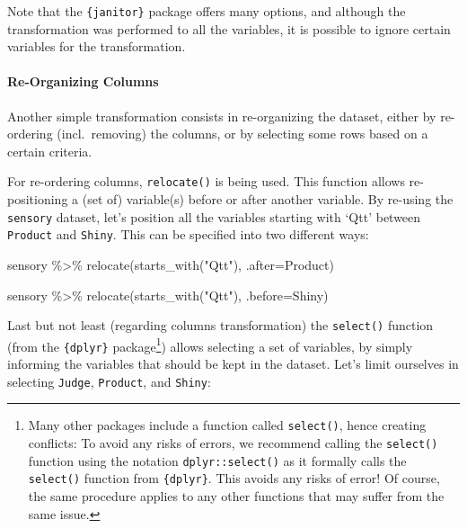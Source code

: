 \documentclass[
]{book}
\newenvironment{Shaded}{\begin{snugshade}}{\end{snugshade}}
\newcommand{\AttributeTok}[1]{\textcolor[rgb]{0.77,0.63,0.00}{#1}}
\newcommand{\FunctionTok}[1]{\textcolor[rgb]{0.00,0.00,0.00}{#1}}
\newcommand{\NormalTok}[1]{#1}
\newcommand{\SpecialCharTok}[1]{\textcolor[rgb]{0.00,0.00,0.00}{#1}}
\newcommand{\StringTok}[1]{\textcolor[rgb]{0.31,0.60,0.02}{#1}}
\begin{document}
Note that the \texttt{\{janitor\}} package offers many options, and although the transformation was performed to all the variables, it is possible to ignore certain variables for the transformation.

\hypertarget{re-organizing-columns}{%
\paragraph{Re-Organizing Columns}\label{re-organizing-columns}}

Another simple transformation consists in re-organizing the dataset, either by re-ordering (incl.~removing) the columns, or by selecting some rows based on a certain criteria.

For re-ordering columns, \texttt{relocate()} is being used. This function allows re-positioning a (set of) variable(s) before or after another variable. By re-using the \texttt{sensory} dataset, let's position all the variables starting with `Qtt' between \texttt{Product} and \texttt{Shiny}. This can be specified into two different ways:

\begin{Shaded}
\begin{Highlighting}[]
\NormalTok{sensory }\SpecialCharTok{\%\textgreater{}\%} 
  \FunctionTok{relocate}\NormalTok{(}\FunctionTok{starts\_with}\NormalTok{(}\StringTok{"Qtt"}\NormalTok{), }\AttributeTok{.after=}\NormalTok{Product)}

\NormalTok{sensory }\SpecialCharTok{\%\textgreater{}\%} 
  \FunctionTok{relocate}\NormalTok{(}\FunctionTok{starts\_with}\NormalTok{(}\StringTok{"Qtt"}\NormalTok{), }\AttributeTok{.before=}\NormalTok{Shiny)}
\end{Highlighting}
\end{Shaded}

Last but not least (regarding columns transformation) the \texttt{select()} function (from the \texttt{\{dplyr\}} package\footnote{Many other packages include a function called \texttt{select()}, hence creating conflicts: To avoid any risks of errors, we recommend calling the \texttt{select()} function using the notation \texttt{dplyr::select()} as it formally calls the \texttt{select()} function from \texttt{\{dplyr\}}. This avoids any risks of error! Of course, the same procedure applies to any other functions that may suffer from the same issue.}) allows selecting a set of variables, by simply informing the variables that should be kept in the dataset. Let's limit ourselves in selecting \texttt{Judge}, \texttt{Product}, and \texttt{Shiny}:
\end{document}

